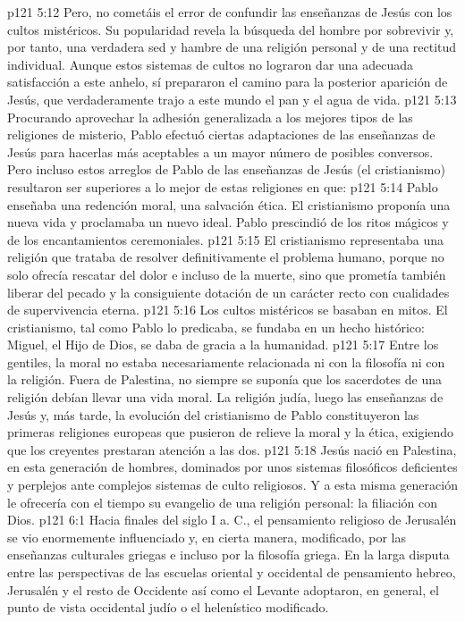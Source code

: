 \vs p121 5:12 \pc Pero, no cometáis el error de confundir las enseñanzas de Jesús con los cultos mistéricos. Su popularidad revela la búsqueda del hombre por sobrevivir y, por tanto, una verdadera sed y hambre de una religión personal y de una rectitud individual. Aunque estos sistemas de cultos no lograron dar una adecuada satisfacción a este anhelo, sí prepararon el camino para la posterior aparición de Jesús, que verdaderamente trajo a este mundo el pan y el agua de vida.
\vs p121 5:13 Procurando aprovechar la adhesión generalizada a los mejores tipos de las religiones de misterio, Pablo efectuó ciertas adaptaciones de las enseñanzas de Jesús para hacerlas más aceptables a un mayor número de posibles conversos. Pero incluso estos arreglos de Pablo de las enseñanzas de Jesús (el cristianismo) resultaron ser superiores a lo mejor de estas religiones en que:
\vs p121 5:14 Pablo enseñaba una redención moral, una salvación ética. El cristianismo proponía una nueva vida y proclamaba un nuevo ideal. Pablo prescindió de los ritos mágicos y de los encantamientos ceremoniales.
\vs p121 5:15 El cristianismo representaba una religión que trataba de resolver definitivamente el problema humano, porque no solo ofrecía rescatar del dolor e incluso de la muerte, sino que prometía también liberar del pecado y la consiguiente dotación de un carácter recto con cualidades de supervivencia eterna.
\vs p121 5:16 Los cultos mistéricos se basaban en mitos. El cristianismo, tal como Pablo lo predicaba, se fundaba en un hecho histórico: Miguel, el Hijo de Dios, se daba de gracia a la humanidad.
\vs p121 5:17 \pc Entre los gentiles, la moral no estaba necesariamente relacionada ni con la filosofía ni con la religión. Fuera de Palestina, no siempre se suponía que los sacerdotes de una religión debían llevar una vida moral. La religión judía, luego las enseñanzas de Jesús y, más tarde, la evolución del cristianismo de Pablo constituyeron las primeras religiones europeas que pusieron de relieve la moral y la ética, exigiendo que los creyentes prestaran atención a las dos.
\vs p121 5:18 Jesús nació en Palestina, en esta generación de hombres, dominados por unos sistemas filosóficos deficientes y perplejos ante complejos sistemas de culto religiosos. Y a esta misma generación le ofrecería con el tiempo su evangelio de una religión personal: la filiación con Dios.
\vs p121 6:1 Hacia finales del siglo I a. C., el pensamiento religioso de Jerusalén se vio enormemente influenciado y, en cierta manera, modificado, por las enseñanzas culturales griegas e incluso por la filosofía griega. En la larga disputa entre las perspectivas de las escuelas oriental y occidental de pensamiento hebreo, Jerusalén y el resto de Occidente así como el Levante adoptaron, en general, el punto de vista occidental judío o el helenístico modificado.
